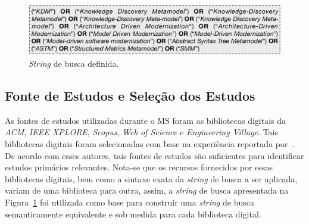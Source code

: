 \begin{figure}[h]
 \caption{\textit{String} de busca definida.}
 \label{fig:string_de_busca}
 \centering
 \includegraphics[scale=0.6]{images/searchStringMS}
 \fautor
\end{figure}

\subsection{Fonte de Estudos e Seleção dos Estudos}\label{subsec:fonte_de_estudo_e_selecao}

As fontes de estudos utilizadas durante o MS foram as bibliotecas digitais da \textit{ACM}, 
\textit{IEEE XPLORE}, \textit{Scopus}, \textit{Web of Science} e \textit{Engineering Village}. Tais bibliotecas digitais foram selecionadas com base na experiência reportada por~. De acordo com esses autores, tais fontes de estudos são suficientes para identificar estudos primários relevantes. Nota-se que os recursos fornecidos por essas bibliotecas digitais, bem como a sintaxe exata da \textit{string} de busca a ser aplicada, variam de uma biblioteca para outra, assim, a \textit{string} de busca apresentada na Figura~\ref{fig:string_de_busca} foi utilizada como base para construir uma \textit{string} de busca semanticamente equivalente e sob medida para cada biblioteca digital. %


 
 
 
